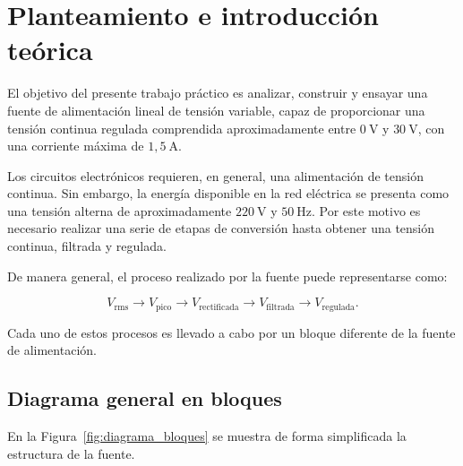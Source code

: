 \documentclass[12pt,a4paper]{article}
\begin{document}
	\tableofcontents
	
	\newpage
	
	\pagestyle{miestilo}
	
	\section{Planteamiento e introducción teórica}
	
	El objetivo del presente trabajo práctico es analizar, construir y ensayar una
	fuente de alimentación lineal de tensión variable, capaz de proporcionar una
	tensión continua regulada comprendida aproximadamente entre
	$0~\text{V}$ y $30~\text{V}$, con una corriente máxima de
	$1,5~\text{A}$.
	
	Los circuitos electrónicos requieren, en general, una alimentación de tensión
	continua. Sin embargo, la energía disponible en la red eléctrica se presenta
	como una tensión alterna de aproximadamente $220~\text{V}$ y $50~\text{Hz}$.
	Por este motivo es necesario realizar una serie de etapas de conversión hasta
	obtener una tensión continua, filtrada y regulada.
	
	De manera general, el proceso realizado por la fuente puede representarse como:
	
	\begin{equation}
		V_{\mathrm{rms}}
		\longrightarrow
		V_{\mathrm{pico}}
		\longrightarrow
		V_{\mathrm{rectificada}}
		\longrightarrow
		V_{\mathrm{filtrada}}
		\longrightarrow
		V_{\mathrm{regulada}}.
	\end{equation}
	
	Cada uno de estos procesos es llevado a cabo por un bloque diferente de la
	fuente de alimentación.
	
	\subsection{Diagrama general en bloques}
	
	En la Figura~\ref{fig:diagrama_bloques} se muestra de forma simplificada la
	estructura de la fuente.
	
\end{document}
